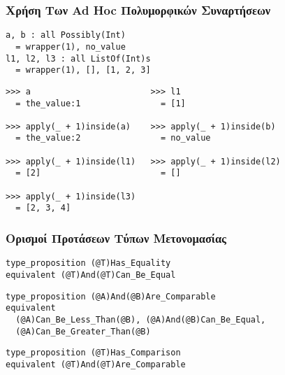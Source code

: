 \documentclass{beamer}
\def\e{\foreignlanguage{english}}
\begin{document}
\begin{frame}[fragile]

\frametitle{Χρήση Των \e{Ad Hoc} Πολυμορφικών Συναρτήσεων}

\begin{otherlanguage}{english}
\begin{verbatim}
a, b : all Possibly(Int)
  = wrapper(1), no_value
l1, l2, l3 : all ListOf(Int)s
  = wrapper(1), [], [1, 2, 3]
\end{verbatim}
\pause
\begin{verbatim}
>>> a                        >>> l1
  = the_value:1                = [1]

>>> apply(_ + 1)inside(a)    >>> apply(_ + 1)inside(b)
  = the_value:2                = no_value

>>> apply(_ + 1)inside(l1)   >>> apply(_ + 1)inside(l2)
  = [2]                        = []

>>> apply(_ + 1)inside(l3)
  = [2, 3, 4]
\end{verbatim}
\end{otherlanguage}

\end{frame}

\begin{frame}[fragile]

\frametitle{Ορισμοί Προτάσεων Τύπων Μετονομασίας}

\begin{otherlanguage}{english}
\begin{verbatim}
type_proposition (@T)Has_Equality
equivalent (@T)And(@T)Can_Be_Equal
\end{verbatim}
\pause
\begin{verbatim}
type_proposition (@A)And(@B)Are_Comparable
equivalent
  (@A)Can_Be_Less_Than(@B), (@A)And(@B)Can_Be_Equal,
  (@A)Can_Be_Greater_Than(@B)
\end{verbatim}
\pause
\begin{verbatim}
type_proposition (@T)Has_Comparison
equivalent (@T)And(@T)Are_Comparable
\end{verbatim}
\end{otherlanguage}

\end{frame}
\end{document}
